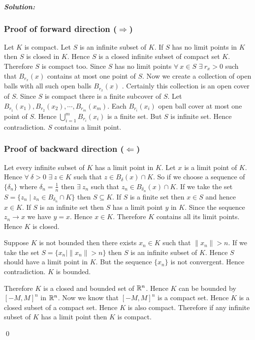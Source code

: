 \documentclass[a4paper, 11pt]{article}
\newcommand{\Qed}{\begin{flushright}\qed\end{flushright}}
\newcommand{\sol}[1]{\begin{solution}#1\end{solution}\Qed}
\newenvironment{solution}
{\textbf{\textit{Solution:}}\setlength{\parindent}{1cm}}
{}
\begin{document}
	\sol{
		\subsubsection*{Proof of forward direction ($\boldsymbol{\Rightarrow}$)}
	Let $K$ is compact. Let $S$ is an infinite subset of $K$. If $S$ has no limit points in $K$ then $S$ is closed in $K$. Hence $S$ is a closed infinite subset of compact set $K$. Therefore $S$ is compact too. Since $S$ has no limit points $\forall\ x\in S$ $\exists \ r_x>0$ such that $B_{r_x}(x)$ contains at most one point of $S$. Now we create a collection of open balls with all such open balls $B_{r_x}(x)$ . Certainly this collection is an open cover of $S$. Since $S$ is compact there is a finite subcover of $S$. Let $B_{r_1}(x_1),B_{r_2}(x_2),\cdots,B_{r_m}(x_m)$. Each  $B_{r_i}(x_i)$ open ball cover at most one point of $S$. Hence $\bigcup\limits_{i=1}^mB_{r_i}(x_i)$ is a finite set. But $S$ is infinite set. Hence contradiction. $S$ contains a limit point.
	\subsubsection*{Proof of backward direction ($\boldsymbol{\Leftarrow}$)}
	Let every infinite subset of $K$ has a limit point in $K$. Let $x$ is a limit point of $K$. Hence $\forall\ \delta>0$ $\exists\ z\in K$ such that $z\in B_{\delta}(x)\cap K$. So if we choose a sequence of $\{\delta_n\}$ where $\delta_n=\frac1n$ then $\exists\ z_n$ such that $z_n\in B_{\delta_n}(x)\cap K$. If we take the set $S=\{z_n\mid z_n\in B_{\delta_n}\cap K\}$ then  $S\subseteq K$. If $S$ is a finite set then $x\in S$ and hence $x\in K$. If $S$ is an infinite set then $S$ has a limit point $y$ in $K$. Since the sequence $z_n\to x$ we have $y=x$. Hence $x\in K$. Therefore $K$ contains all its limit points. Hence $K$ is closed. 
	
	Suppose $K$ is not bounded then there exists $x_n\in K$ such that $\|x_n\|>n$. If we take the set $S=\{x_n\mid \|x_n\|>n\}$ then $S$ is an infinite subset of $K$. Hence $S$ should have a limit point in $K$. But the sequence $\{x_n\}$ is not convergent. Hence contradiction. $K$ is bounded. 
	
	Therefore $K$ is a closed and bounded set of $\mathbb{R}^n$. Hence $K$ can be bounded by $[-M,M]^n$ in $\mathbb{R}^n$. Now we know that $[-M,M]^n$ is a compact set. Hence $K$ is a closed subset of a compact set. Hence $K$ is also compact. Therefore if any infinite subset of $K$ has a limit point then $K$ is compact.
}
	
	
	
\end{document}
